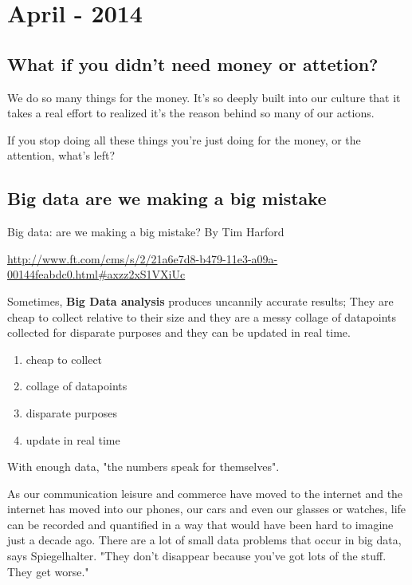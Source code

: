 
\chapter[April - 2014]{April - 2014} %

\label{ch:apr:2014} %

\section{What if you didn't need money or attetion?}

We do so many things for the money. 
It's so deeply built into our culture that it takes a real effort to 
realized it's the reason behind so many of our actions.

If you stop doing all these things you're just doing for the money, 
or the attention, what's left?

\section{Big data  are we making a big mistake}
Big data: are we making a big mistake?
By Tim Harford

\url{http://www.ft.com/cms/s/2/21a6e7d8-b479-11e3-a09a-00144feabdc0.html#axzz2xS1VXiUc}

Sometimes, {\bf Big Data analysis} produces uncannily accurate results; They are cheap to collect relative to their size and they are a messy collage of datapoints collected for disparate purposes and
they can be updated in real time. 

\begin{enumerate}
\item cheap to collect
\item collage of datapoints
\item disparate purposes
\item update in real time
\end{enumerate}

With enough data, "the numbers speak for themselves".

As our communication leisure and commerce have moved to the internet and the internet has moved into our phones, our cars and even our glasses or watches,  life can be recorded and quantified in a way that would have been hard to imagine just a decade ago.
There are a lot of small data problems that occur in big data, says Spiegelhalter.  "They don't disappear because you've got lots of the stuff. They get worse."


